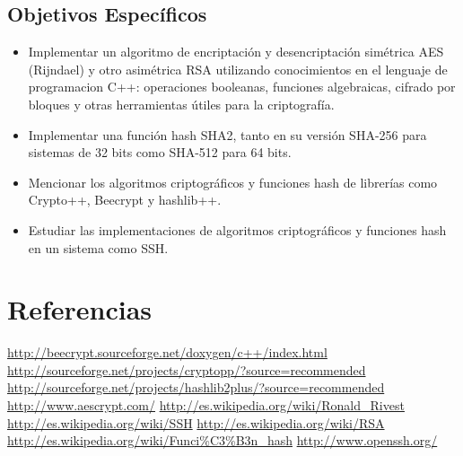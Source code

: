 \documentclass[spanish]{article}
\begin{document}
\subsection{Objetivos Específicos}
\begin{itemize}
\item Implementar un algoritmo de encriptación y desencriptación simétrica AES (Rijndael) y otro asimétrica RSA utilizando conocimientos en el lenguaje de programacion C++: operaciones booleanas, funciones algebraicas, cifrado por bloques y otras herramientas útiles para la criptografía.
\item Implementar una función hash SHA2, tanto en su versión SHA-256 para sistemas de 32 bits como SHA-512 para 64 bits.
\item Mencionar los algoritmos criptográficos y funciones hash de librerías como Crypto++, Beecrypt y hashlib++.
\item Estudiar las implementaciones de algoritmos criptográficos y funciones hash en un sistema como SSH.
\end{itemize}

\section{Referencias}
\begin{thebibliography}{9}

\bibitem{}\url{http://beecrypt.sourceforge.net/doxygen/c++/index.html}
\bibitem{}\url{http://sourceforge.net/projects/cryptopp/?source=recommended}
\bibitem{}\url{http://sourceforge.net/projects/hashlib2plus/?source=recommended}
\bibitem{}\url{http://www.aescrypt.com/}
\bibitem{}\url{http://es.wikipedia.org/wiki/Ronald_Rivest}
\bibitem{}\url{http://es.wikipedia.org/wiki/SSH}
\bibitem{}\url{http://es.wikipedia.org/wiki/RSA}
\bibitem{}\url{http://es.wikipedia.org/wiki/Funci%C3%B3n_hash}
\bibitem{}\url{http://www.openssh.org/}


\end{thebibliography}
\end{document}
